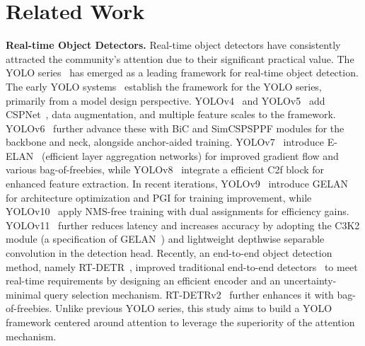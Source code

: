 \section{Related Work}
\label{sec:related}



\noindent\textbf{Real-time Object Detectors.} 
Real-time object detectors have consistently attracted the community's attention due to their significant practical value.
%
The YOLO series~\cite{redmon2016yolov1, redmon2017yolo9000, redmon2018yolov3, bochkovskiy2020yolov4, jocher2020yolov5, li2023yolov6, wang2023yolov7, wang2024gold, chen2023yolo, yolov8, wang2024yolov9, wang2024yolov10, jocher2024yolov11} has emerged as a leading framework for real-time object detection.
%
The early YOLO systems~\cite{redmon2016yolov1, redmon2017yolo9000, redmon2018yolov3} establish the framework for the YOLO series, primarily from a model design perspective. 
%
YOLOv4~\cite{bochkovskiy2020yolov4} and YOLOv5~\cite{jocher2020yolov5} add CSPNet~\cite{wang2020cspnet}, data augmentation, and multiple feature scales to the framework. YOLOv6~\cite{li2023yolov6} further advance these with BiC and SimCSPSPPF modules for the backbone and neck, alongside anchor-aided training. 
%
YOLOv7~\cite{wang2023yolov7} introduce E-ELAN~\cite{wang2022designing_elan} (efficient layer aggregation networks) for improved gradient flow and various bag-of-freebies, while YOLOv8~\cite{yolov8} integrate a efficient C2f block for enhanced feature extraction.
%
In recent iterations, YOLOv9~\cite{wang2024yolov9} introduce GELAN for architecture optimization and PGI for training improvement, while YOLOv10~\cite{wang2024yolov10} apply NMS-free training with dual assignments for efficiency gains. YOLOv11~\cite{jocher2024yolov11} further reduces latency and increases accuracy by adopting the C3K2 module (a specification of GELAN~\cite{wang2024yolov9}) and lightweight depthwise separable convolution in the detection head. 
%
Recently, an end-to-end object detection method, namely RT-DETR~\cite{zhao2024rtdetrs}, improved traditional end-to-end detectors~\cite{carion2020detr, liu2022dab_detr, zhu2020deformable_detr, meng2021conditional_detr, li2022dn_detr} to meet real-time requirements by designing an efficient encoder and an uncertainty-minimal query selection mechanism. RT-DETRv2~\cite{lv2024rt_detrv2} further enhances it with bag-of-freebies.
%
Unlike previous YOLO series, this study aims to build a YOLO framework centered around attention to leverage the superiority of the attention mechanism.



